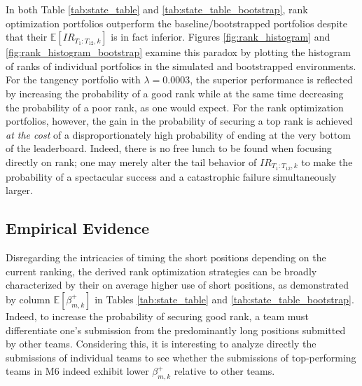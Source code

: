 \documentclass[3p,times,twocolumn]{elsarticle}
\begin{document}
In both Table \ref{tab:state_table} and \ref{tab:state_table_bootstrap}, rank optimization portfolios outperform the baseline/bootstrapped portfolios despite that their $\mathbb{E}[IR_{T_{1}:T_{12},k}]$ is in fact inferior.
Figures \ref{fig:rank_histogram} and \ref{fig:rank_histogram_bootstrap} examine this paradox by plotting the histogram of ranks of individual portfolios in the simulated and bootstrapped environments.
For the tangency portfolio with $\lambda=0.0003$, the superior performance is reflected by increasing the probability of a good rank while at the same time decreasing the probability of a poor rank, as one would expect.
For the rank optimization portfolios, however, the gain in the probability of securing a top rank is achieved \emph{at the cost} of a disproportionately high probability of ending at the very bottom of the leaderboard.
Indeed, there is no free lunch to be found when focusing directly on rank; one may merely alter the tail behavior of $IR_{T_{1}:T_{12},k}$ to make the probability of a spectacular success and a catastrophic failure simultaneously larger.



\subsection{Empirical Evidence}

Disregarding the intricacies of timing the short positions depending on the current ranking, the derived rank optimization strategies can be broadly characterized by their on average higher use of short positions, as demonstrated by column $\mathbb{E}[\beta_{m,k}^{+}]$ in Tables \ref{tab:state_table} and \ref{tab:state_table_bootstrap}.
Indeed, to increase the probability of securing good rank, a team must differentiate one's submission from the predominantly long positions submitted by other teams.
Considering this, it is interesting to analyze directly the submissions of individual teams to see whether the submissions of top-performing teams in M6 indeed exhibit lower $\beta^{+}_{m,k}$ relative to other teams.
\end{document}
